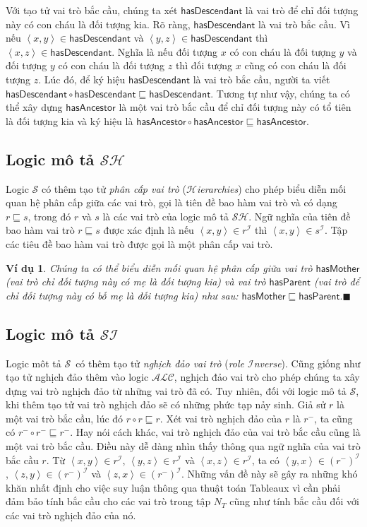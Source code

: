 \documentclass[12pt,a4paper]{report}
\newtheorem{Example}{Ví dụ}[chapter]
\newcommand{\myend}{\mbox{}\hfill\mbox{{\scriptsize$\!\blacksquare$}}}
\newcommand{\ALC}{$\mathcal{ALC}$}
\newcommand{\LogicS}{$\mS$}
\newcommand{\SI}{$\mathcal{SI}$}
\newcommand{\SH}{$\mathcal{SH}$}
\newcommand{\mI}{\mathcal{I}}
\newcommand{\mS}{\mathcal{S}}
\def\tuple#1{\left\langle#1\right\rangle}
\begin{document}
Với tạo tử vai trò bắc cầu, chúng ta xét $\mathsf{hasDescendant}$ là vai trò để chỉ đối tượng này có con cháu là đối tượng kia. Rõ ràng, $\mathsf{hasDescendant}$ là vai trò bắc cầu. Vì nếu $\tuple{x,y} \in \mathsf{hasDescendant}$ và $\tuple{y, z} \in \mathsf{hasDescendant}$ thì $\tuple{x,z} \in \mathsf{hasDescendant}$. Nghĩa là nếu đối tượng $x$ có con cháu là đối tượng $y$ và đối tượng $y$ có con cháu là đối tượng $z$ thì đối tượng $x$ cũng có con cháu là đối tượng $z$. Lúc đó, để ký hiệu $\mathsf{hasDescendant}$ là vai trò bắc cầu, người ta viết $\mathsf{hasDescendant} \circ \mathsf{hasDescendant} \sqsubseteq \mathsf{hasDescendant}$. Tương tự như vậy, chúng ta có thể xây dựng $\mathsf{hasAncestor}$ là một vai trò bắc cầu để chỉ đối tượng này có tổ tiên là đối tượng kia và ký hiệu là $\mathsf{hasAncestor \circ hasAncestor \sqsubseteq hasAncestor}$.
\subsection{Logic mô tả \SH}
Logic $\mS$ có thêm tạo tử \textit{phân cấp vai trò} (\textit{$\mathcal{H}$ierarchies}) cho phép biểu diễn mối quan hệ phân cấp giữa các vai trò, gọi là tiên đề bao hàm vai trò và có dạng $r \sqsubseteq s$, trong đó $r$ và $s$ là các vai trò của logic mô tả \SH. Ngữ nghĩa của tiên đề bao hàm vai trò $r \sqsubseteq s$ được xác định là nếu $\tuple{x,y} \in r^\mI$ thì $\tuple{x,y} \in s^\mI$. Tập các tiêu đề bao hàm vai trò được gọi là một phân cấp vai trò.

\begin{Example}
Chúng ta có thể biểu diễn mối quan hệ phân cấp giữa vai trò $\mathsf{hasMother}$ (vai trò chỉ đối tượng này có mẹ là đối tượng kia) và vai trò $\mathsf{hasParent}$ (vai trò để chỉ đối tượng này có bố mẹ là đối tượng kia) như sau: $\mathsf{hasMother} \sqsubseteq \mathsf{hasParent}.$\myend
\end{Example}

\subsection{Logic mô tả \SI}
Logic môt tả \LogicS\ có thêm tạo tử \textit{nghịch đảo vai trò} (\textit{role $\mathcal{I}$nverse}). Cũng giống như tạo tử nghịch đảo thêm vào logic \ALC, nghịch đảo vai trò cho phép chúng ta xây dựng vai trò nghịch đảo từ những vai trò đã có. Tuy nhiên, đối với logic mô tả \LogicS, khi thêm tạo tử vai trò nghịch đảo sẽ có những phức tạp nảy sinh. Giả sử $r$ là một vai trò bắc cầu, lúc đó $r \circ r \sqsubseteq r$. Xét vai trò nghịch đảo của $r$ là $r^-$, ta cũng có $r^- \circ r^- \sqsubseteq r^-$. Hay nói cách khác, vai trò nghịch đảo của vai trò bắc cầu cũng là một vai trò bắc cầu. Điều này dễ dàng nhìn thấy thông qua ngữ nghĩa của vai trò bắc cầu $r$. Từ $\tuple{x, y} \in r^\mI$, $\tuple{y, z} \in r^\mI$ và $\tuple{x, z} \in r^\mI$, ta có $\tuple{y, x} \in (r^-)^\mI$, $\tuple{z, y} \in (r^-)^\mI$ và $\tuple{z, x} \in (r^-)^\mI$. Những vấn đề này sẽ gây ra những khó khăn nhất định cho việc suy luận thông qua thuật toán Tableaux vì cần phải đảm bảo tính bắc cầu cho các vai trò trong tập $N_T$ cũng như tính bắc cầu đối với các vai trò nghịch đảo của nó.
\end{document}
